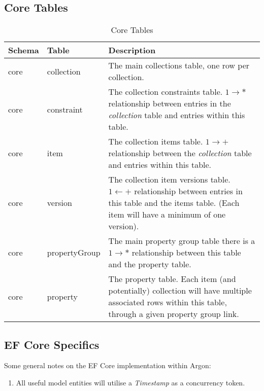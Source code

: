 \documentclass{book}
\begin{document}
\subsection{Core Tables}
\begin{table}[H]
    \centering
    \begin{tabular}{|| p{0.1\linewidth} | p{0.2\linewidth} | p{0.7\linewidth} ||}
        \hline
        \textbf{Schema} & \textbf{Table} & \textbf{Description}\\
        \hline
        core & collection & The main collections table, one row per collection.\\
        \hline
        core & constraint & The collection constraints table. $1 \rightarrow *$ relationship between entries in the \textit{collection} table and entries within this table. \\
        \hline
        core & item & The collection items table.  $1 \rightarrow +$ relationship between the \textit{collection} table and entries within this table.\\
        \hline
        core & version & The collection item versions table. $1 \leftarrow +$ relationship between entries in this table and the items table.  (Each item will have a minimum of one version).\\
        \hline
        core & propertyGroup & The main property group table there is a $1 \rightarrow *$ relationship between this table and the property table.\\
        \hline
        core & property & The property table. Each item (and potentially) collection will have multiple associated rows within this table, through a given property group link. \\
        \hline 
    \end{tabular}
    \caption{Core Tables}
    \label{table_core_tables}
\end{table}

\subsection{EF Core Specifics}
Some general notes on the EF Core implementation within Argon:
\begin{enumerate}
    \item All useful model entities will utilise a \textit{Timestamp} as a concurrency token. 
\end{enumerate}
\end{document}
